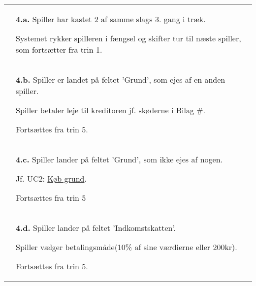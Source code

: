 \documentclass[class=article, crop=false]{standalone}
\begin{document}
\begin{table}[H]
\begin{tabularx}{\textwidth}{|l|X|}
            & \textbf{4.a.} Spiller har kastet 2 af samme slags 3. gang i træk.
            \begin{enumerate} \begin{tabenum}
                                  \item Systemet rykker spilleren i fængsel og skifter tur til næste spiller, som fortsætter fra trin 1.
            \end{tabenum} \end{enumerate}
            \\




            & \textbf{4.b.} Spiller er landet på feltet
            'Grund', som ejes af en anden spiller.
            \begin{enumerate} \begin{tabenum}
                                  \item Spiller betaler leje til kreditoren
                                  jf. skøderne i Bilag \#.
                                  \item Fortsættes fra trin 5.
            \end{tabenum} \end{enumerate}
            \\
            & \textbf{4.c.} Spiller lander på feltet
            'Grund', som ikke ejes af nogen.
            \begin{enumerate} \begin{tabenum}
                                  \item Jf. UC2: \underline{Køb grund}.
                                  \item Fortsættes fra trin 5
            \end{tabenum} \end{enumerate}
            \\

            & \textbf{4.d.} Spiller lander på feltet
            'Indkomstskatten'.
            \begin{enumerate} \begin{tabenum}
                                  \item Spiller vælger betalingsmåde(10\% af sine værdierne eller 200kr).
                                  \item Fortsættes fra trin 5.
            \end{tabenum} \end{enumerate}
            \\





\end{tabularx}
\end{table}
\end{document}
